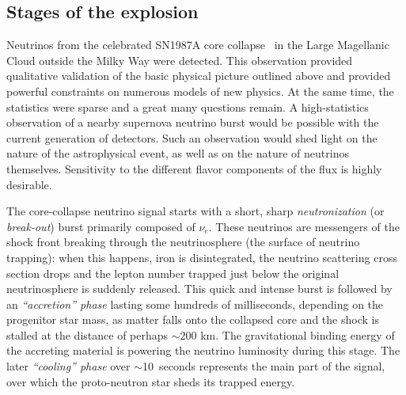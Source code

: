 
\subsection{Stages of the explosion}

Neutrinos from the celebrated SN1987A core
collapse~\cite{Bionta:1987qt,Hirata:1987hu} in the Large Magellanic
Cloud outside the Milky Way were detected. This observation provided qualitative validation of the basic physical picture outlined above and provided powerful constraints on numerous models of new physics. At the same time, the
statistics %
were sparse %
and a great many questions remain.  A high-statistics observation of a
nearby supernova neutrino burst would be possible with the current
generation of detectors. Such an observation would shed light
on %
the nature of the astrophysical event, as well as on the nature of
neutrinos themselves.  Sensitivity to the different flavor components
of the flux is highly desirable.

The core-collapse neutrino signal starts with a short, sharp
\emph{neutronization} (or \emph{break-out}) burst primarily composed of
$\nu_e$. These neutrinos are messengers of the shock front breaking through the neutrinosphere (the surface of neutrino trapping): when this happens, iron is disintegrated, the neutrino scattering cross section drops and the lepton number trapped just below the original neutrinosphere is suddenly released. This quick and intense burst is followed by an
\emph{``accretion'' phase} lasting some hundreds of milliseconds, depending on the progenitor star mass, as matter falls onto the collapsed core and the shock is stalled at the distance of perhaps $\sim 200$ km. The gravitational binding energy of the accreting material is powering the neutrino luminosity during this stage. The later
\emph{``cooling'' phase} over $\sim$10~seconds represents the main part of
the signal, over which the proto-neutron star sheds its trapped energy.  

